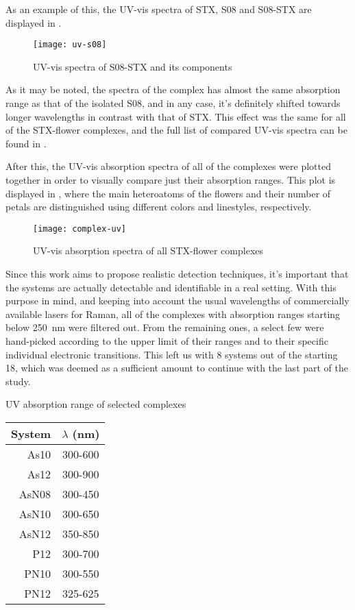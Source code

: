 As an example of this, the UV-vis spectra of STX, S08 and S08-STX are displayed in .

\begin{figure}
    \texttt{[image: uv-s08]}
    \caption[UV-vis spectrum of S08-STX]{UV-vis spectra of S08-STX and its components}
\end{figure}

As it may be noted, the spectra of the complex has almost the same absorption range as that of the isolated S08, and in any case, it's definitely shifted towards longer wavelengths in contrast with that of STX.
This effect was the same for all of the STX-flower complexes, and the full list of compared UV-vis spectra can be found in .

After this, the UV-vis absorption spectra of all of the complexes were plotted together in order to visually compare just their absorption ranges. This plot is displayed in , where the main heteroatoms of the flowers and their number of petals are distinguished using different colors and linestyles, respectively.

\begin{figure*}
    \texttt{[image: complex-uv]}
    \caption[UV-vis absorption spectra of all complexes]{UV-vis absorption spectra of all STX-flower complexes}
\end{figure*}

Since this work aims to propose realistic detection techniques, it's important that the systems are actually detectable and identifiable in a real setting.
With this purpose in mind, and keeping into account the usual wavelengths of commercially available lasers for Raman, all of the complexes with absorption ranges starting below \SI{250}{\nano\metre} were filtered out.
From the remaining ones, a select few were hand-picked according to the upper limit of their ranges and to their specific individual electronic transitions.
This left us with 8 systems out of the starting 18, which was deemed as a sufficient amount to continue with the last part of the study.

\begin{margintable}
    \centering
    \caption[UV absorption range of selected complexes]{UV absorption range of selected complexes}
    \begin{tabular}{@{}rc@{}}
        \toprule
        System & $\lambda$ (\si{\nano\metre}) \\
        \midrule
        As10 & 300-600 \\
        As12 & 300-900 \\
        AsN08 & 300-450 \\
        AsN10 & 300-650 \\
        AsN12 & 350-850 \\
        P12 & 300-700 \\
        PN10 & 300-550 \\
        PN12 & 325-625 \\
    \end{tabular}
\end{margintable}

